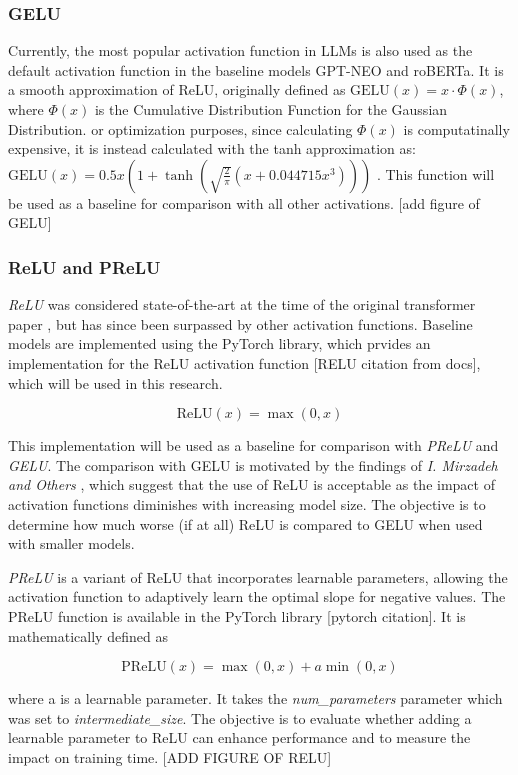 \subsubsection{GELU}
Currently, the most popular activation function in LLMs is also used as the default activation function in the baseline models GPT-NEO and roBERTa. It is a smooth approximation of ReLU, originally defined as \(\text{GELU}(x) = x \cdot \Phi(x)\), where \(\Phi(x)\) is the Cumulative Distribution Function for the Gaussian Distribution. or optimization purposes, since calculating \(\Phi(x)\) is computatinally expensive, it is instead calculated with the tanh approximation as:
\(\text{GELU}(x) = 0.5x \left(1 + \tanh\left(\sqrt{\frac{2}{\pi}} \left(x + 0.044715x^3\right)\right)\right)\) \cite{Hendrycks2023}. This function will be used as a baseline for comparison with all other activations.
[add figure of GELU]

\subsubsection{ReLU and PReLU}
\textit{ReLU} was considered state-of-the-art at the time of the original transformer paper \cite{Vaswani2017}, but has since been surpassed by other activation functions. Baseline models are implemented using the PyTorch library, which prvides an implementation for the ReLU activation function [RELU citation from docs], which will be used in this research. 

\[
\text{ReLU}(x) = \max(0, x)
\]

This implementation will be used as a baseline for comparison with \textit{PReLU} and \textit{GELU}. The comparison with GELU is motivated by the findings of \textit{I. Mirzadeh and Others} \cite{Mirzadeh2023}, which suggest that the use of ReLU is acceptable as the impact of activation functions diminishes with increasing model size. The objective is to determine how much worse (if at all) ReLU is compared to GELU when used with smaller models.

\textit{PReLU} is a variant of ReLU that incorporates learnable parameters, allowing the activation function to adaptively learn the optimal slope for negative values. The PReLU function is available in the PyTorch library [pytorch citation]. It is mathematically defined as

\[
\text{PReLU}(x) = \max(0, x) + a \min(0, x)
\]

where a is a learnable parameter. It takes the \textit{num\_parameters} parameter which was set to \textit{intermediate\_size}. The objective is to evaluate whether adding a learnable parameter to ReLU can enhance performance and to measure the impact on training time.
[ADD FIGURE OF RELU]

